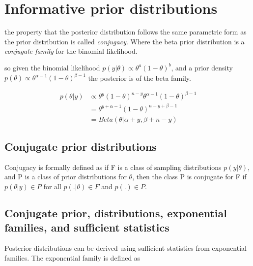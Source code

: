 \documentclass[
]{book}
\theoremstyle{definition}
\theoremstyle{definition}
\theoremstyle{definition}
\theoremstyle{definition}
\theoremstyle{remark}
\begin{document}
\hypertarget{informative-prior-distributions}{%
\section{Informative prior distributions}\label{informative-prior-distributions}}

the property that the posterior distribution follows the same parametric form as the prior distribution is called \emph{conjugacy}. Where the beta prior distribution is a \emph{conjugate family} for the binomial likelihood.

so given the binomial likelihood \(p(y|\theta)\propto \theta^a(1-\theta)^b\), and a prior density \(p(\theta)\propto \theta^{\alpha-1}(1-\theta)^{\beta-1}\) the posterior is of the beta family.

\[
\begin{aligned}
 p(\theta | y) &\propto \theta^y(1-\theta)^{n-y}\theta^{\alpha-1}(1-\theta)^{\beta-1}\\
 &= \theta^{y+\alpha-1}(1-\theta)^{n-y+\beta-1}\\
 &= Beta(\theta | \alpha+y, \beta+n-y)
\end{aligned}
\]

\hypertarget{conjugate-prior-distributions}{%
\subsection*{Conjugate prior distributions}\label{conjugate-prior-distributions}}

Conjugacy is formally defined as if F is a class of sampling distributions \(p(y|\theta)\), and P is a class of prior distributions for \(\theta\), then the class P is conjugate for F if \(p(\theta | y) \in P\) for all \(p(.|\theta)\in F\) and \(p(.)\in P\).

\hypertarget{conjugate-prior-distributions-exponential-families-and-sufficient-statistics}{%
\subsection*{Conjugate prior, distributions, exponential families, and sufficient statistics}\label{conjugate-prior-distributions-exponential-families-and-sufficient-statistics}}

Posterior distributions can be derived using sufficient statistics from exponential families. The exponential family is defined as
\end{document}
